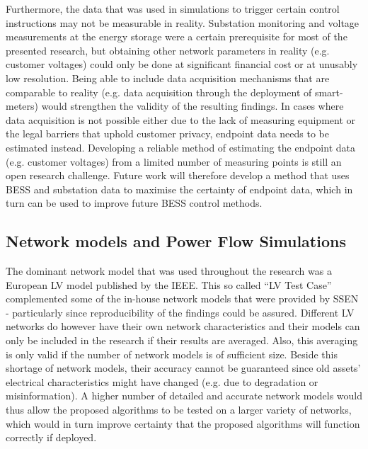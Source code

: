 Furthermore, the data that was used in simulations to trigger certain control instructions may not be measurable in reality.
Substation monitoring and voltage measurements at the energy storage were a certain prerequisite for most of the presented research, but obtaining other network parameters in reality (e.g. customer voltages) could only be done at significant financial cost or at unusably low resolution.
Being able to include data acquisition mechanisms that are comparable to reality (e.g. data acquisition through the deployment of smart-meters) would strengthen the validity of the resulting findings.
In cases where data acquisition is not possible either due to the lack of measuring equipment or the legal barriers that uphold customer privacy, endpoint data needs to be estimated instead.
Developing a reliable method of estimating the endpoint data (e.g. customer voltages) from a limited number of measuring points is still an open research challenge.
Future work will therefore develop a method that uses BESS and substation data to maximise the certainty of endpoint data, which in turn can be used to improve future BESS control methods.

\subsection{Network models and Power Flow Simulations}

The dominant network model that was used throughout the research was a European LV model published by the IEEE.
This so called ``LV Test Case'' complemented some of the in-house network models that were provided by SSEN - particularly since reproducibility of the findings could be assured.
Different LV networks do however have their own network characteristics and their models can only be included in the research if their results are averaged.
Also, this averaging is only valid if the number of network models is of sufficient size.
Beside this shortage of network models, their accuracy cannot be guaranteed since old assets' electrical characteristics might have changed (e.g. due to degradation or misinformation).
A higher number of detailed and accurate network models would thus allow the proposed algorithms to be tested on a larger variety of networks, which would in turn improve certainty that the proposed algorithms will function correctly if deployed.

